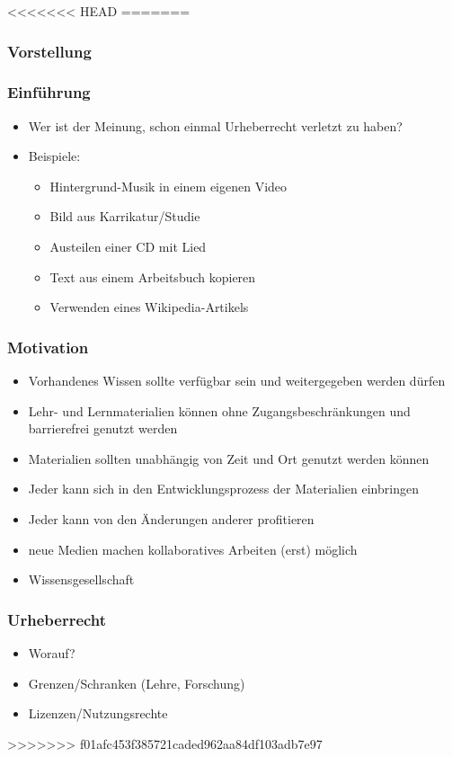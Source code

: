 \documentclass[14pt,handout]{beamer}
\begin{document}
<<<<<<< HEAD
=======
\begin{frame}
    \frametitle{Vorstellung}
\end{frame}

\begin{frame}
    \frametitle{Einführung}
    \begin{itemize}
        \item Wer ist der Meinung, schon einmal Urheberrecht verletzt zu haben?
        \item Beispiele:
        \begin{itemize}
          \item Hintergrund-Musik in einem eigenen Video
          \item Bild aus Karrikatur/Studie
          \item Austeilen einer CD mit Lied
          \item Text aus einem Arbeitsbuch kopieren
          \item Verwenden eines Wikipedia-Artikels
        \end{itemize}
    \end{itemize}
\end{frame}

\begin{frame}
    \frametitle{Motivation}
    \begin{itemize}
        \item Vorhandenes Wissen sollte verfügbar sein und weitergegeben werden dürfen
        \item Lehr- und Lernmaterialien können ohne Zugangsbeschränkungen und barrierefrei genutzt werden
        \item Materialien sollten unabhängig von Zeit und Ort genutzt werden können
        \item Jeder kann sich in den Entwicklungsprozess der Materialien einbringen
        \item Jeder kann von den Änderungen anderer profitieren
        \item neue Medien machen kollaboratives Arbeiten (erst) möglich
        \item Wissensgesellschaft
    \end{itemize}
\end{frame}

\begin{frame}
    \frametitle{Urheberrecht}
    \begin{itemize}
        \item Worauf?
        \item Grenzen/Schranken (Lehre, Forschung)
        \item Lizenzen/Nutzungsrechte
    \end{itemize}
\end{frame}
>>>>>>> f01afc453f385721caded962aa84df103adb7e97
\end{document}
